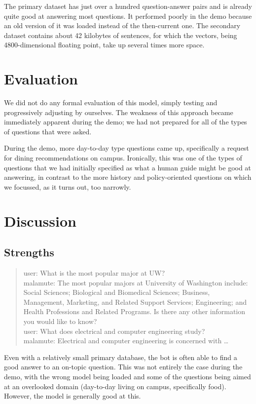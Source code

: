 \documentclass[11pt]{article}
\begin{document}
The primary dataset has just over a hundred question-answer pairs and is already quite good at answering most questions. It performed poorly in the demo because an old version of it was loaded instead of the then-current one. The secondary dataset contains about 42 kilobytes of sentences, for which the vectors, being 4800-dimensional floating point, take up several times more space.

\section{Evaluation}

We did not do any formal evaluation of this model, simply testing and progressively adjusting by ourselves. The weakness of this approach became immediately apparent during the demo; we had not prepared for all of the types of questions that were asked.

During the demo, more day-to-day type questions came up, specifically a request for dining recommendations on campus. Ironically, this was one of the types of questions that we had initially specified as what a human guide might be good at answering, in contrast to the more history and policy-oriented questions on which we focussed, as it turns out, too narrowly.

\section{Discussion}

\subsection{Strengths}

\begin{quote}
	user: What is the most popular major at UW? \\
	malamute: The most popular majors at University of Washington include: Social Sciences; Biological and Biomedical Sciences; Business, Management, Marketing, and Related Support Services; Engineering; and Health Professions and Related Programs. Is there any other information you would like to know? \\
	user: What does electrical and computer engineering study? \\
	malamute: Electrical and computer engineering is concerned with \ldots
\end{quote}

Even with a relatively small primary database, the bot is often able to find a good answer to an on-topic question. This was not entirely the case during the demo, with the wrong model being loaded and some of the questions being aimed at an overlooked domain (day-to-day living on campus, specifically food). However, the model is generally good at this.
\end{document}
